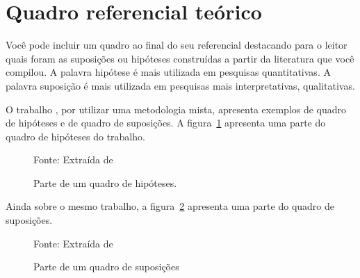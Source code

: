 \section{Quadro referencial teórico}

Você pode incluir um quadro ao final do seu referencial destacando para o leitor quais foram as suposições ou hipóteses construídas a partir da literatura que você compilou. A palavra hipótese é mais utilizada em pesquisas quantitativas. A palavra suposição é mais utilizada em pesquisas mais interpretativas, qualitativas.

O trabalho \cite{DissertacaoElton2015}, por utilizar uma metodologia mista, apresenta exemplos de quadro de hipóteses e de quadro de suposições. A figura~\ref{fig:quadro_hipoteses} apresenta uma parte do quadro de hipóteses do trabalho. 

\begin{figure}[ht]
    \centering
    \caption{Parte de um quadro de hipóteses.}
            {Fonte: Extraída de \cite[37]{DissertacaoElton2015}}
    \label{fig:quadro_hipoteses}
\end{figure}

Ainda sobre o mesmo trabalho, a figura~\ref{fig:quadro_suposicoes} apresenta uma parte do quadro de suposições.

\begin{figure}[ht]
    \centering
    \caption{Parte de um quadro de suposições}
        {Fonte: Extraída de \cite[38]{DissertacaoElton2015}}
    \label{fig:quadro_suposicoes}
\end{figure}